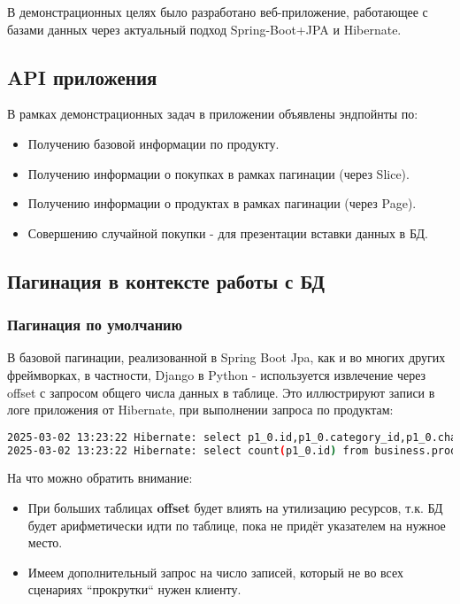 В демонстрационных целях было разработано веб-приложение, работающее с базами данных через актуальный подход
Spring-Boot+JPA и Hibernate.

\subsection{API приложения}\label{subsec:api-server-app}
В рамках демонстрационных задач в приложении объявлены эндпойнты по:
\begin{itemize}
    \item Получению базовой информации по продукту.
    \item Получению информации о покупках в рамках пагинации (через Slice).
    \item Получению информации о продуктах в рамках пагинации (через Page).
    \item Совершению случайной покупки - для презентации вставки данных в БД.
\end{itemize}

\subsection{Пагинация в контексте работы с БД}\label{subsec:jpapagination}

\subsubsection{Пагинация по умолчанию}\label{subsubsec:defaultpagination}
В базовой пагинации, реализованной в Spring Boot Jpa, как и во многих других фреймворках,
в частности, Django в Python - используется извлечение через offset с запросом общего числа данных в таблице.
Это иллюстрируют записи в логе приложения от Hibernate, при выполнении запроса по продуктам:

\begin{lstlisting}[language=bash, frame=single, basicstyle=\normalsize\ttfamily, breaklines=true,label={lst:hiberpagelog}]
2025-03-02 13:23:22 Hibernate: select p1_0.id,p1_0.category_id,p1_0.characteristics,p1_0.description,p1_0.name,p1_0.price from business.product p1_0 offset ? rows fetch first ? rows only
2025-03-02 13:23:22 Hibernate: select count(p1_0.id) from business.product p1_0
\end{lstlisting}

На что можно обратить внимание:
\begin{itemize}
    \item При больших таблицах \textbf{offset} будет влиять на утилизацию ресурсов, т.к. БД будет арифметически
    идти по таблице, пока не придёт указателем на нужное место.
    \item Имеем дополнительный запрос на число записей, который не во всех сценариях ``прокрутки`` нужен клиенту.
\end{itemize}

